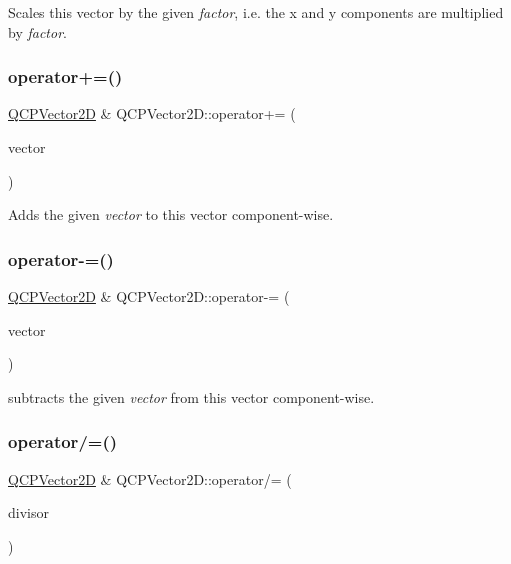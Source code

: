 Scales this vector by the given {\itshape factor}, i.\+e. the x and y components are multiplied by {\itshape factor}. \mbox{\label{class_q_c_p_vector2_d_aa2c34754ce8839b2d074dec741783c5e}} 
\subsubsection{\texorpdfstring{operator+=()}{operator+=()}}
{\footnotesize\ttfamily \hyperlink{class_q_c_p_vector2_d}{Q\+C\+P\+Vector2D} \& Q\+C\+P\+Vector2\+D\+::operator+= (\begin{DoxyParamCaption}\item[{const \hyperlink{class_q_c_p_vector2_d}{Q\+C\+P\+Vector2D} \&}]{vector }\end{DoxyParamCaption})}

Adds the given {\itshape vector} to this vector component-\/wise. \mbox{\label{class_q_c_p_vector2_d_a3a2e906bb924983bb801e89f28a3d566}} 
\subsubsection{\texorpdfstring{operator-\/=()}{operator-=()}}
{\footnotesize\ttfamily \hyperlink{class_q_c_p_vector2_d}{Q\+C\+P\+Vector2D} \& Q\+C\+P\+Vector2\+D\+::operator-\/= (\begin{DoxyParamCaption}\item[{const \hyperlink{class_q_c_p_vector2_d}{Q\+C\+P\+Vector2D} \&}]{vector }\end{DoxyParamCaption})}

subtracts the given {\itshape vector} from this vector component-\/wise. \mbox{\label{class_q_c_p_vector2_d_aefa55eb9282c066a330ca281881e0ec0}} 
\subsubsection{\texorpdfstring{operator/=()}{operator/=()}}
{\footnotesize\ttfamily \hyperlink{class_q_c_p_vector2_d}{Q\+C\+P\+Vector2D} \& Q\+C\+P\+Vector2\+D\+::operator/= (\begin{DoxyParamCaption}\item[{double}]{divisor }\end{DoxyParamCaption})}

